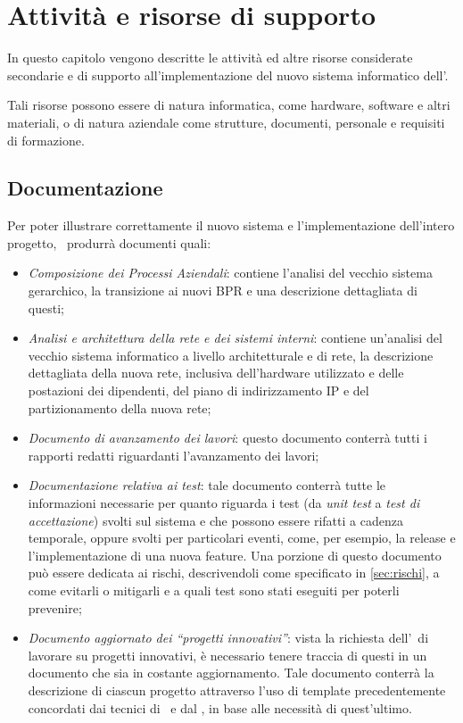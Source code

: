 \chapter{Attività e risorse di supporto}\label{ch:supporto}

In questo capitolo vengono descritte le attività ed altre risorse considerate secondarie e di supporto all'implementazione del nuovo sistema informatico dell'\istituto.

Tali risorse possono essere di natura informatica, come hardware, software e altri materiali, o di natura aziendale come strutture, documenti, personale e requisiti di formazione.

\section{Documentazione}

	Per poter illustrare correttamente il nuovo sistema e l'implementazione dell'intero progetto, \azienda~produrrà documenti quali:
	\begin{itemize}[noitemsep]
		
		\item \textit{Composizione dei Processi Aziendali}: contiene l'analisi del vecchio sistema gerarchico, la transizione ai nuovi BPR e una descrizione dettagliata di questi;
		
		\item \textit{Analisi e architettura della rete e dei sistemi interni}: contiene un'analisi del vecchio sistema informatico a livello architetturale e di rete, la descrizione dettagliata della nuova rete, inclusiva dell'hardware utilizzato e delle postazioni dei dipendenti, del piano di indirizzamento IP e del partizionamento della nuova rete;

		\item \textit{Documento di avanzamento dei lavori}: questo documento conterrà tutti i rapporti redatti riguardanti l'avanzamento dei lavori;
		
		\item \textit{Documentazione relativa ai test}: tale documento conterrà tutte le informazioni necessarie per quanto riguarda i test (da \textit{unit test} a \textit{test di accettazione}) svolti sul sistema e che possono essere rifatti a cadenza temporale, oppure svolti per particolari eventi, come, per esempio, la release e l'implementazione di una nuova feature.
		Una porzione di questo documento può essere dedicata ai rischi, descrivendoli come specificato in \ref{sec:rischi}, a come evitarli o mitigarli e a quali test sono stati eseguiti per poterli prevenire;
		
		\newpage
		\item \textit{Documento aggiornato dei ``progetti innovativi''}: vista la richiesta dell'\istituto~di lavorare su progetti innovativi, è necessario tenere traccia di questi in un documento che sia in costante aggiornamento.
		Tale documento conterrà la descrizione di ciascun progetto attraverso l'uso di template precedentemente concordati dai tecnici di \azienda~e dal \proponente, in base alle necessità di quest'ultimo.
		
	\end{itemize}

